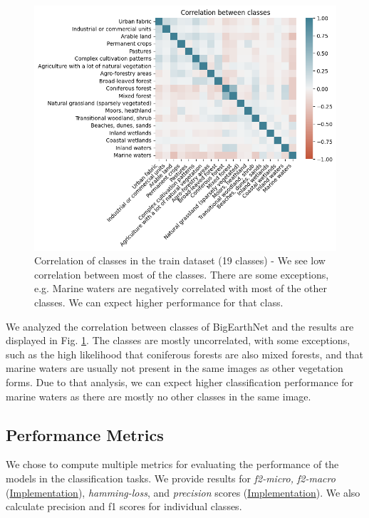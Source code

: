 \begin{figure}[h]
  \centering
  \includegraphics[width=\columnwidth]{images/correlation.png}
  \caption{Correlation of classes in the train dataset (19 classes) - We see low correlation between most of the classes. There are some exceptions, e.g. Marine waters are negatively correlated with most of the other classes. We can expect higher performance for that class.}
  \label{fig:correlation}
\end{figure}

We analyzed the correlation between classes of BigEarthNet and the results are displayed in Fig. \ref{fig:correlation}. The classes are mostly uncorrelated, with some exceptions, such as the high likelihood that coniferous forests are also mixed forests, and that marine waters are usually not present in the same images as other vegetation forms. Due to that analysis, we can expect higher classification performance for marine waters as there are mostly no other classes in the same image.

\subsection{Performance Metrics}

We chose to compute multiple metrics for evaluating the performance of the models in the classification tasks. We provide results for \textit{f2-micro, f2-macro} (\href{https://scikit-learn.org/stable/modules/generated/sklearn.metrics.fbeta_score.html}{Implementation}), \textit{hamming-loss}, and \textit{precision} scores (\href{https://scikit-learn.org/stable/modules/generated/sklearn.metrics.precision_score.html}{Implementation}). We also calculate precision and f1 scores for individual classes.


